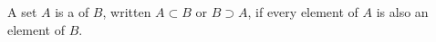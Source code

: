 


\begin{defn}\label{definition:sets:subset}
A set $A$ is a  of $B$, written $A \subset B$\label{setcontain} or $B \supset A$, if every element of $A$ is also an element of $B$.  
\end{defn}

